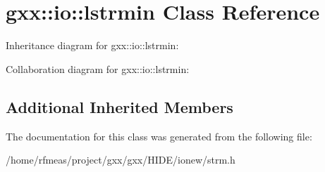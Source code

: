 \hypertarget{classgxx_1_1io_1_1lstrmin}{}\section{gxx\+:\+:io\+:\+:lstrmin Class Reference}
\label{classgxx_1_1io_1_1lstrmin}


Inheritance diagram for gxx\+:\+:io\+:\+:lstrmin\+:


Collaboration diagram for gxx\+:\+:io\+:\+:lstrmin\+:
\subsection*{Additional Inherited Members}


The documentation for this class was generated from the following file\+:\begin{DoxyCompactItemize}
\item 
/home/rfmeas/project/gxx/gxx/\+H\+I\+D\+E/ionew/strm.\+h\end{DoxyCompactItemize}
